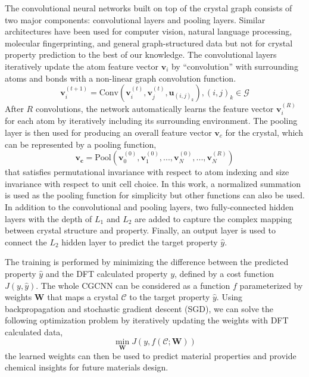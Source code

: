 \documentclass[twocolumn, prl]{revtex4-1}
\begin{document}
The convolutional neural networks built on top of the crystal graph consists of two major components: convolutional layers and pooling layers. Similar architectures have been used for computer vision\cite{krizhevsky2012imagenet}, natural language processing\cite{collobert2008unified}, molecular fingerprinting\cite{duvenaud2015convolutional}, and general graph-structured data\cite{henaff2015deep, GilmerSRVD17} but not for crystal property prediction to the best of our knowledge. The convolutional layers iteratively update the atom feature vector $\bm{v}_i$ by ``convolution'' with surrounding atoms and bonds with a non-linear graph convolution function.
\begin{equation} \label{eq:conv}
	\bm{v}_i^{(t+1)} = \textrm{Conv}\left( \bm{v}_i^{(t)}, \bm{v}_j^{(t)}, \bm{u}_{(i, j)_k} \right), (i, j)_k \in \mathcal{G}
\end{equation}
After $R$ convolutions, the network automatically learns the feature vector $\bm{v}_i^{(R)}$ for each atom by iteratively including its surrounding environment. The pooling layer is then used for producing an overall feature vector $\bm{v}_c$ for the crystal, which can be represented by a pooling function,
\begin{equation}
  \bm{v_c} = \textrm{Pool} \left(\bm{v}_0^{(0)}, \bm{v}_1^{(0)}, ..., \bm{v}_N^{(0)}, ..., \bm{v}_N^{(R)} \right)
\end{equation}
that satisfies permutational invariance with respect to atom indexing and size invariance with respect to unit cell choice. In this work, a normalized summation is used as the pooling function for simplicity but other functions can also be used. In addition to the convolutional and pooling layers, two fully-connected hidden layers with the depth of $L_1$ and $L_2$ are added to capture the complex mapping between crystal structure and property. Finally, an output layer is used to connect the $L_2$ hidden layer to predict the target property $\hat{y}$. 

The training is performed by minimizing the difference between the predicted property $\hat{y}$ and the DFT calculated property $y$, defined by a cost function $J(y, \hat{y})$. The whole CGCNN can be considered as a function $f$ parameterized by weights $\bm{W}$ that maps a crystal $\mathcal{C}$ to the target property $\hat{y}$. Using backpropagation and stochastic gradient descent (SGD), we can solve the following optimization problem by iteratively updating the weights with DFT calculated data,
\begin{equation}\label{eq:optimization}
	\displaystyle{\min_{\bm{W}} J(y, f(\mathcal{C}; \bm{W}))}
\end{equation}
the learned weights can then be used to predict material properties and provide chemical insights for future materials design. 
\end{document}
